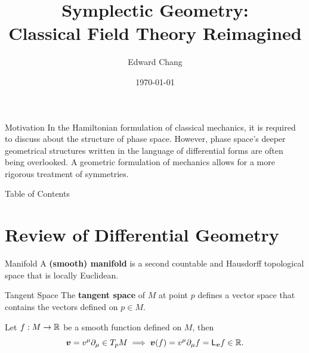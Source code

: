 \documentclass{beamer}
\title{Symplectic Geometry:\\Classical Field Theory Reimagined}
\author{Edward Chang}
\institute{University of Waterloo, Department of Applied Mathematics\\ Perimeter Institute for Theoretical Physics}
\date{\today}
\begin{document}
\frame{\titlepage}


\begin{frame}
  \begin{block}{Motivation}
    In the Hamiltonian formulation of classical mechanics, it is required to discuss about the structure of phase space. However, phase space's deeper geometrical structures written in the language of differential forms are often being overlooked. A geometric formulation of mechanics allows for a more rigorous treatment of symmetries.
  \end{block}
\end{frame}

\begin{frame}{Table of Contents}
  \tableofcontents
\end{frame}


\section{Review of Differential Geometry}
\begin{frame}{}
  \begin{block}{Manifold}
    A \textbf{(smooth) manifold} is a second countable and Hausdorff topological space that is locally Euclidean.
  \end{block}
\end{frame}

\begin{frame}{}
    \begin{block}{Tangent Space}
      The \textbf{tangent space} of \(M\) at point \(p\) defines a vector space that contains the vectors defined on \(p \in M\).
    \end{block}
    \begin{example}
      Let \(f: M \to \mathbb{R}\) be a smooth function defined on \(M\), then
      \begin{equation}
        \boldsymbol{v} = v ^{\mu} \partial _{\mu} \in T _{p} M \implies \boldsymbol{v}(f) = v ^{\mu} \partial _{\mu} f = \mathsf{L}_ {\boldsymbol{v}} f \in \mathbb{R}.
      \end{equation}
    \end{example}
\end{frame}
\end{document}
